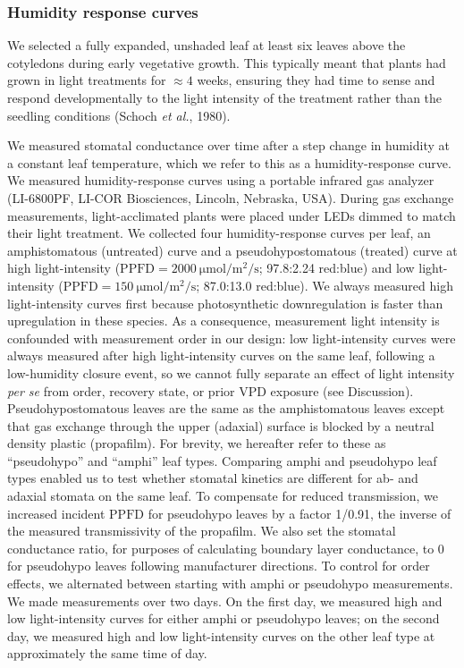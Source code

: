 \documentclass[
  letterpaper,
  DIV=11,
  numbers=noendperiod]{scrartcl}
\newcommand{\ppfd}{$\mathrm{PPFD}$}
\newcommand{\ppfdequals}[1]{$\mathrm{PPFD} = \SI{#1}{\micro\mole\per\meter\squared\per\second}$}
\begin{document}
\subsubsection{Humidity response curves}\label{humidity-response-curves}

We selected a fully expanded, unshaded leaf at least six leaves above
the cotyledons during early vegetative growth. This typically meant that
plants had grown in light treatments for \(\approx 4\) weeks, ensuring
they had time to sense and respond developmentally to the light
intensity of the treatment rather than the seedling conditions (Schoch
\emph{et al.}, 1980).

We measured stomatal conductance over time after a step change in
humidity at a constant leaf temperature, which we refer to this as a
humidity-response curve. We measured humidity-response curves using a
portable infrared gas analyzer (LI-6800PF, LI-COR Biosciences, Lincoln,
Nebraska, USA). During gas exchange measurements, light-acclimated
plants were placed under LEDs dimmed to match their light treatment. We
collected four humidity-response curves per leaf, an amphistomatous
(untreated) curve and a pseudohypostomatous (treated) curve at high
light-intensity (\ppfdequals{2000}; 97.8:2.24 red:blue) and low
light-intensity (\ppfdequals{150}; 87.0:13.0 red:blue). We always
measured high light-intensity curves first because photosynthetic
downregulation is faster than upregulation in these species. As a
consequence, measurement light intensity is confounded with measurement
order in our design: low light-intensity curves were always measured
after high light-intensity curves on the same leaf, following a
low-humidity closure event, so we cannot fully separate an effect of
light intensity \emph{per se} from order, recovery state, or prior VPD
exposure (see Discussion). Pseudohypostomatous leaves are the same as
the amphistomatous leaves except that gas exchange through the upper
(adaxial) surface is blocked by a neutral density plastic (propafilm).
For brevity, we hereafter refer to these as ``pseudohypo'' and ``amphi''
leaf types. Comparing amphi and pseudohypo leaf types enabled us to test
whether stomatal kinetics are different for ab- and adaxial stomata on
the same leaf. To compensate for reduced transmission, we increased
incident \ppfd{} for pseudohypo leaves by a factor 1/0.91, the inverse
of the measured transmissivity of the propafilm. We also set the
stomatal conductance ratio, for purposes of calculating boundary layer
conductance, to 0 for pseudohypo leaves following manufacturer
directions. To control for order effects, we alternated between starting
with amphi or pseudohypo measurements. We made measurements over two
days. On the first day, we measured high and low light-intensity curves
for either amphi or pseudohypo leaves; on the second day, we measured
high and low light-intensity curves on the other leaf type at
approximately the same time of day.
\end{document}
